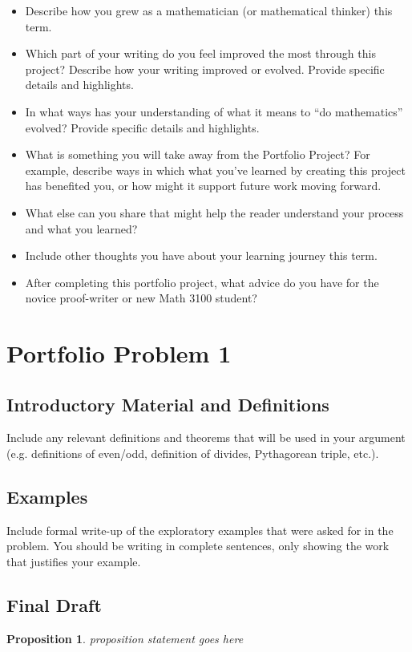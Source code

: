 \documentclass[12pt]{article}
\newtheorem*{prop}{Proposition}
\theoremstyle{definition}
\begin{document}
\begin{itemize}
    \item Describe how you grew as a mathematician (or mathematical thinker) this term. 
    \item Which part of your writing do you feel improved the most through this project? Describe how your writing improved or evolved. Provide specific details and highlights.
    \item In what ways has your understanding of what it means to ``do mathematics'' evolved? Provide specific details and highlights.
    \item What is something you will take away from the Portfolio Project? For example, describe ways in which what you've learned by creating this project has benefited you, or how might it support future work moving forward.
    \item What else can you share that might help the reader understand your process and what you learned?
    \item Include other thoughts you have about your learning journey this term.
    \item After completing this portfolio project, what advice do you have for the novice proof-writer or new Math 3100 student?
\end{itemize}




\section{Portfolio Problem 1}

\subsection{Introductory Material and Definitions} Include any relevant definitions and theorems that will be used in your argument (e.g. definitions of even/odd, definition of divides, Pythagorean triple, etc.).

\subsection{Examples} Include formal write-up of the exploratory examples that were asked for in the problem. You should be writing in complete sentences, only showing the work that justifies your example. 


\subsection{Final Draft}
\begin{prop}
proposition statement goes here
\end{prop}
\end{document}
